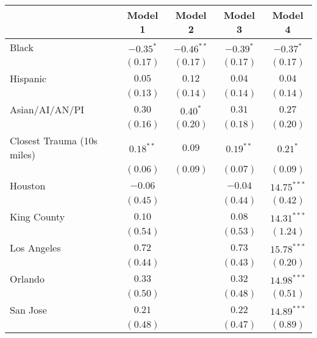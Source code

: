 
\begin{table}[ht!]
\begin{center}
\begin{tabular}{l c c c c}
\toprule
 & Model 1 & Model 2 & Model 3 & Model 4 \\
\midrule
Black                      & $-0.35^{*}$  & $-0.46^{**}$  & $-0.39^{*}$  & $-0.37^{*}$    \\
                           & $(0.17)$     & $(0.17)$      & $(0.17)$     & $(0.17)$       \\
Hispanic                   & $0.05$       & $0.12$        & $0.04$       & $0.04$         \\
                           & $(0.13)$     & $(0.14)$      & $(0.14)$     & $(0.14)$       \\
Asian/AI/AN/PI             & $0.30$       & $0.40^{*}$    & $0.31$       & $0.27$         \\
                           & $(0.16)$     & $(0.20)$      & $(0.18)$     & $(0.20)$       \\
Closest Trauma (10s miles) & $0.18^{**}$  & $0.09$        & $0.19^{**}$  & $0.21^{*}$     \\
                           & $(0.06)$     & $(0.09)$      & $(0.07)$     & $(0.09)$       \\
Houston                    & $-0.06$      &               & $-0.04$      & $14.75^{***}$  \\
                           & $(0.45)$     &               & $(0.44)$     & $(0.42)$       \\
King County                & $0.10$       &               & $0.08$       & $14.31^{***}$  \\
                           & $(0.54)$     &               & $(0.53)$     & $(1.24)$       \\
Los Angeles                & $0.72$       &               & $0.73$       & $15.78^{***}$  \\
                           & $(0.44)$     &               & $(0.43)$     & $(0.20)$       \\
Orlando                    & $0.33$       &               & $0.32$       & $14.98^{***}$  \\
                           & $(0.50)$     &               & $(0.48)$     & $(0.51)$       \\
San Jose                   & $0.21$       &               & $0.22$       & $14.89^{***}$  \\
                           & $(0.48)$     &               & $(0.47)$     & $(0.89)$       \\

\end{tabular}
\end{center}
\end{table}

